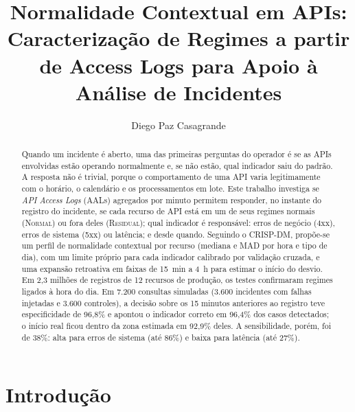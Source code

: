 \documentclass[sigconf,nonacm]{acmart}
\newcommand{\Normal}{\textsc{Normal}\xspace}
\newcommand{\Residual}{\textsc{Residual}\xspace}
\begin{document}
\title{Normalidade Contextual em APIs: Caracterização de Regimes a partir de Access Logs para Apoio à Análise de Incidentes}

\author{Diego Paz Casagrande}

\renewcommand{\shortauthors}{D. P. Casagrande}

\begin{abstract}
Quando um incidente é aberto, uma das primeiras perguntas do operador é se as APIs envolvidas estão operando normalmente e, se não estão, qual indicador saiu do padrão. A resposta não é trivial, porque o comportamento de uma API varia legitimamente com o horário, o calendário e os processamentos em lote. Este trabalho investiga se \emph{API Access Logs} (AALs) agregados por minuto permitem responder, no instante do registro do incidente, se cada recurso de API está em um de seus regimes normais (\Normal) ou fora deles (\Residual); qual indicador é responsável: erros de negócio (4xx), erros de sistema (5xx) ou latência; e desde quando. Seguindo o CRISP-DM, propõe-se um perfil de normalidade contextual por recurso (mediana e MAD por hora e tipo de dia), com um limite próprio para cada indicador calibrado por validação cruzada, e uma expansão retroativa em faixas de 15~min a 4~h para estimar o início do desvio. Em 2,3 milhões de registros de 12 recursos de produção, os testes confirmaram regimes ligados à hora do dia. Em 7.200 consultas simuladas (3.600 incidentes com falhas injetadas e 3.600 controles), a decisão sobre os 15 minutos anteriores ao registro teve especificidade de 96,8\% e apontou o indicador correto em 96,4\% dos casos detectados; o início real ficou dentro da zona estimada em 92,9\% deles. A sensibilidade, porém, foi de 38\%: alta para erros de sistema (até 86\%) e baixa para latência (até 27\%).
\end{abstract}


\maketitle

\section{Introdução}
\end{document}

